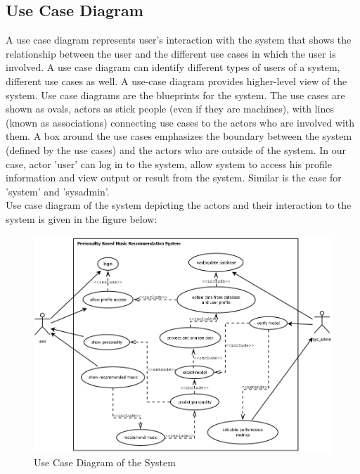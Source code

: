\newpage
\subsection{Use Case Diagram}
A use case diagram represents user's interaction with the system that shows the relationship between the user and the different use cases in which the user is involved. A use case diagram can identify different types of users of a system, different use cases as well. A use-case diagram provides higher-level view of the system. Use case diagrams are the blueprints for the system. The use cases are shown as ovals, actors as stick people (even if they are machines), with lines (known as associations) connecting use cases to the actors who are involved with them. A box around the use cases emphasizes the boundary between the system (defined by the use cases) and the actors who are outside of the system. In our case, actor 'user' can log in to the system, allow system to access his profile information and view output or result from the system. Similar is the case for 'system' and 'sysadmin'. 
\\
Use case diagram of the system depicting the actors and their interaction to the system is given in the figure below:
\begin{figure}[!ht]
\centering
\includegraphics[width = 16 cm]{fig/new/usecase.png}
\caption{Use Case Diagram of the System}
\label{fig:usecase}
\end{figure}

